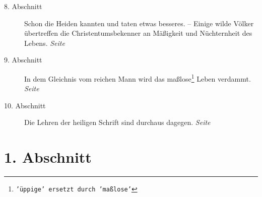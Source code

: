 \begin{description}
\item[8. Abschnitt] Schon die Heiden kannten und taten etwas besseres. --
Einige wilde Völker übertreffen die Christentumsbekenner an Mäßigkeit und
Nüchternheit des Lebens.
\dotfill \textit{Seite~\pageref{kap14_ab8}}\\
\item[9. Abschnitt] In dem Gleichnis vom reichen Mann wird das maßlose\footnote{\texttt{'üppige' ersetzt durch 'maßlose'}} Leben
verdammt.
\dotfill \textit{Seite~\pageref{kap14_ab9}}\\
\item[10. Abschnitt] Die Lehren der heiligen Schrift sind durchaus dagegen.
\dotfill \textit{Seite~\pageref{kap14_ab10}}\\
\end{description}

\newpage

\section{1. Abschnitt} \label{kap14_ab1}

